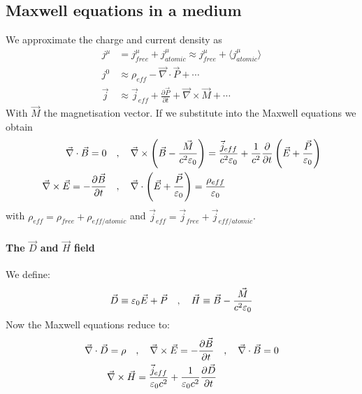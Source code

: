 \subsection{Maxwell equations in a medium}

We approximate the charge and current density as
\begin{align*}
    j^\mu &= j_{free}^\mu + j_{atomic}^\mu \approx j_{free}^\mu + \langle j_{atomic}^\mu \rangle
    \\
    j^0 &\approx \rho_{eff} - \vec{\nabla} \cdot \vec{P} + \dotsb
    \\
    \vec{j} &\approx \vec{j}_{eff} + \frac{\partial \vec{P}}{\partial t} + \vec{\nabla} \times \vec{M} + \dotsb
\end{align*}
With $\vec{M}$ the magnetisation vector. If we substitute into the Maxwell
equations we obtain
\begin{align*}
    \vec{\nabla} \cdot \vec{B} = 0
    \hspace{10pt} &, \hspace{10pt}
    \vec{\nabla} \times \left( \vec{B} - \frac{\vec{M}}{c^2 \varepsilon_0} \right)
    = \frac{\vec{j}_{eff}}{c^2 \varepsilon_0} + \frac{1}{c^2} \frac{\partial}{\partial t} \left( \vec{E} + \frac{\vec{P}}{\varepsilon_0} \right)
    \\
    \vec{\nabla} \times \vec{E} = - \frac{\partial \vec{B}}{\partial t}
    \hspace{10pt} &, \hspace{10pt}
    \vec{\nabla} \cdot \left( \vec{E} + \frac{\vec{P}}{\varepsilon_0} \right) = \frac{\rho_{eff}}{\varepsilon_0}
\end{align*}
with $\rho_{eff} = \rho_{free} + \rho_{eff/atomic}$ and
$\vec{j}_{eff} = \vec{j}_{free} + \vec{j}_{eff/atomic}$.

\paragraph{The $\vec{D}$ and $\vec{H}$ field}
We define:
\begin{align*}
    \vec{D} \equiv \varepsilon_0 \vec{E} + \vec{P}
    \hspace{10pt} , \hspace{10pt}
    \vec{H} \equiv \vec{B} - \frac{\vec{M}}{c^2 \varepsilon_0}
\end{align*}
Now the Maxwell equations reduce to:
\begin{align*}
    \vec{\nabla} \cdot \vec{D} = \rho
    \hspace{10pt} &, \hspace{10pt}
    \vec{\nabla} \times \vec{E} = - \frac{\partial \vec{B}}{\partial t}
    \hspace{10pt} , \hspace{10pt}
    \vec{\nabla} \cdot \vec{B} = 0
    \\
    \vec{\nabla} \times \vec{H} &= \frac{\vec{j}_{eff}}{\varepsilon_0 c^2} + \frac{1}{\varepsilon_0 c^2} \frac{\partial \vec{D}}{\partial t}
\end{align*}

